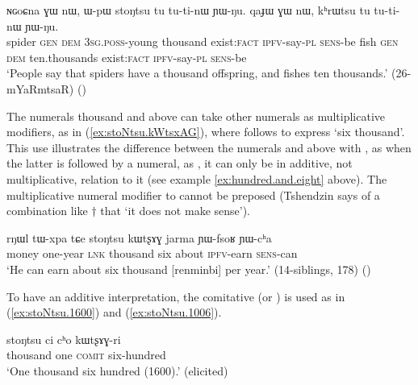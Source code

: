 \begin{exe}
\ex \label{ex:stoNtsu}
\gll ɴɢoɕna ɣɯ nɯ, ɯ-pɯ stoŋtsu tu tu-ti-nɯ ɲɯ-ŋu. qaɟɯ ɣɯ nɯ, kʰrɯtsu tu tu-ti-nɯ ɲɯ-ŋu. \\
spider \textsc{gen} \textsc{dem} \textsc{3sg}.\textsc{poss}-young thousand exist:\textsc{fact} \textsc{ipfv}-say-\textsc{pl} \textsc{sens}-be fish \textsc{gen} \textsc{dem} ten.thousands exist:\textsc{fact} \textsc{ipfv}-say-\textsc{pl} \textsc{sens}-be  \\
\glt `People say that spiders have a thousand offspring, and fishes ten thousands.' (26-mYaRmtsaR)
()
\end{exe}

The numerals thousand and above can take other numerals as multiplicative modifiers, as in (\ref{ex:stoNtsu.kWtsxAG}), where  follows   to express `six thousand'. This use illustrates the difference between the numerals  and above with , as when the latter is followed by a numeral, as , it can only be in additive, not multiplicative, relation to it (see example \ref{ex:hundred.and.eight} above). The multiplicative numeral modifier to  cannot be preposed (Tshendzin says of a combination like $\dagger$ that  `it does not make sense').

\begin{exe}
\ex  \label{ex:stoNtsu.kWtsxAG}
 \gll   rŋɯl tɯ-xpa tɕe stoŋtsu kɯtʂɤɣ jarma ɲɯ-fsoʁ ɲɯ-cʰa \\
 money one-year \textsc{lnk} thousand six about \textsc{ipfv}-earn \textsc{sens}-can \\
 \glt `He can earn about six thousand [renminbi] per year.' (14-siblings, 178) ()
\end{exe}
  
 To have an additive interpretation, the comitative  (or ) is used as in (\ref{ex:stoNtsu.1600}) and (\ref{ex:stoNtsu.1006}).
 
\begin{exe}
\ex  \label{ex:stoNtsu.1600}
\gll  stoŋtsu ci cʰo kɯtʂɤɣ-ri \\
 thousand one \textsc{comit} six-hundred \\
\glt `One thousand six hundred (1600).' (elicited)
\end{exe}
  
